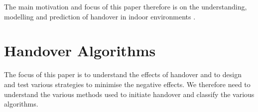 The main motivation and focus of this paper therefore is on the understanding, modelling and prediction of handover in indoor environments .





\section{Handover Algorithms}
\label{sec:algorithms}
The focus of this paper is to understand the effects of handover and to design and test various strategies to minimise the negative effects. We therefore need to understand the various methods used to initiate handover and classify the various algorithms.

